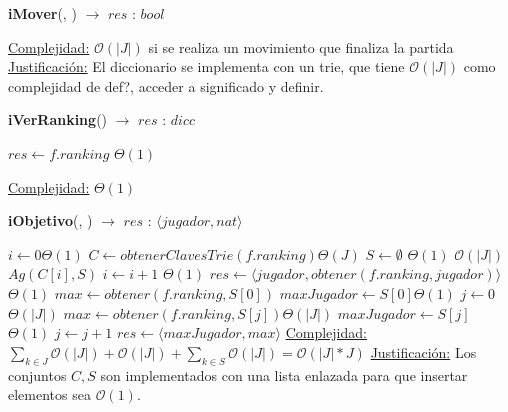 \documentclass{book}
\newcommand{\bigO}{\mathcal{O}}
\begin{document}
\begin{Algoritmos}
\begin{algorithm}[H]{\textbf{iMover}(, ) $\to$ $res$ : $bool$}
\begin{algorithmic}[1]
			\medskip
			\Statex \underline{Complejidad:} $\bigO(|J|)$ si se realiza un movimiento que finaliza la partida
			\Statex \underline{Justificación:} El diccionario se implementa con un trie, que tiene $\bigO(|J|)$ como complejidad de def?, acceder a significado y definir.
    	\end{algorithmic}
\end{algorithm}
	

\begin{algorithm}[H]{\textbf{iVerRanking}() $\to$ $res$ : $dicc$}
	\begin{algorithmic}[1]
			 \State $res \gets f.ranking$	 \Comment $\Theta(1)$
    
			\medskip
			\Statex \underline{Complejidad:} $\Theta(1)$
    	\end{algorithmic}
\end{algorithm}	


\begin{algorithm}[H]{\textbf{iObjetivo}(, ) $\to$ $res$ : $\langle jugador, nat\rangle$}
	\begin{algorithmic}[1]

			 
			 \State $i \gets 0$\Comment $\Theta(1)$
			 \State $C \gets obtenerClavesTrie(f.ranking)$\Comment $\Theta(J)$
			 \State $S \gets \emptyset$ \Comment $\Theta(1)$
			 			\Comment $\bigO(|J|)$
			 	\State $Ag(C[i], S)$ 
			 	\EndIf
				\State $i \gets i + 1$		\Comment $\Theta(1)$
			 \EndWhile
			 \State $res \gets \langle jugador, obtener(f.ranking, jugador)\rangle$	\Comment $\Theta(1)$
			 \Else
			 \State $max \gets obtener(f.ranking, S[0])$ \Comment{$\bigO(|J|)$}
			 \State $maxJugador \gets S[0]$\Comment $\Theta(1)$
			 \State $j \gets 0$
			 \Comment $\Theta(|J|)$
			 \State $max\gets obtener(f.ranking, S[j])$\Comment $\Theta(|J|)$
			 \State $maxJugador\gets S[j]$\Comment $\Theta(1)$
			 \EndIf
			 \State $j\gets j+1$
			 \EndWhile
			 \State $res \gets \langle maxJugador, max\rangle$
			 \EndIf
			\medskip
			\Statex \underline{Complejidad:} $\sum_{k\in J}\bigO(|J|)+\bigO(|J|)+\sum_{k\in S}\bigO(|J|)=\bigO(|J|*J)$
			\Statex \underline{Justificación:} Los conjuntos $C,S$ son implementados con una lista enlazada para que insertar elementos sea $\bigO(1)$.
    	\end{algorithmic}
\end{algorithm}	


\end{Algoritmos}
\end{document}
